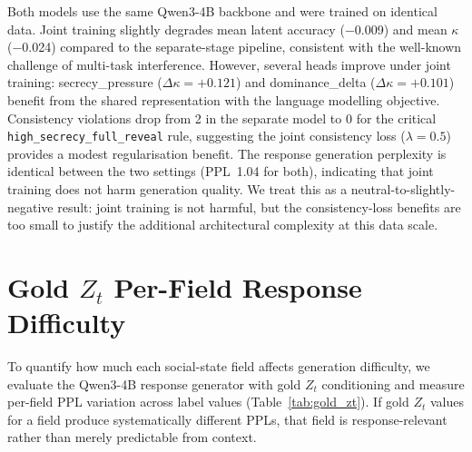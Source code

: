 \documentclass[11pt]{article}
\begin{document}
Both models use the same Qwen3-4B backbone and were trained on identical data.
Joint training slightly degrades mean latent accuracy ($-$0.009) and mean $\kappa$ ($-$0.024) compared to the separate-stage pipeline, consistent with the well-known challenge of multi-task interference.
However, several heads improve under joint training: secrecy\_pressure ($\Delta\kappa{=}+0.121$) and dominance\_delta ($\Delta\kappa{=}+0.101$) benefit from the shared representation with the language modelling objective.
Consistency violations drop from 2 in the separate model to 0 for the critical \texttt{high\_secrecy\_full\_reveal} rule, suggesting the joint consistency loss ($\lambda{=}0.5$) provides a modest regularisation benefit.
The response generation perplexity is identical between the two settings (PPL~1.04 for both), indicating that joint training does not harm generation quality.
We treat this as a neutral-to-slightly-negative result: joint training is not harmful, but the consistency-loss benefits are too small to justify the additional architectural complexity at this data scale.

\section{Gold $Z_t$ Per-Field Response Difficulty}
\label{app:gold_zt_bridge}

To quantify how much each social-state field affects generation difficulty, we evaluate the Qwen3-4B response generator with gold $Z_t$ conditioning and measure per-field PPL variation across label values (Table~\ref{tab:gold_zt}).
If gold $Z_t$ values for a field produce systematically different PPLs, that field is response-relevant rather than merely predictable from context.

\begin{table}[tp]
\centering
\caption{Gold $Z_t$ per-field response PPL variation ($n=500$ examples). Effect size is Cohen's $d$ across label values.}
\label{tab:gold_zt}
\footnotesize
{}
\end{table}
\end{document}
